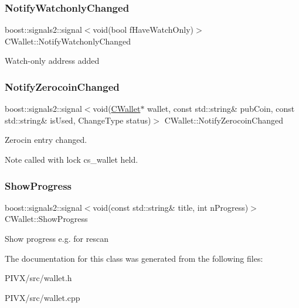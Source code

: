 \subsubsection{\texorpdfstring{Notify\+Watchonly\+Changed}{NotifyWatchonlyChanged}}
{\footnotesize\ttfamily boost\+::signals2\+::signal$<$void(bool f\+Have\+Watch\+Only)$>$ C\+Wallet\+::\+Notify\+Watchonly\+Changed}

Watch-\/only address added \mbox{\label{class_c_wallet_a30f82cd0f9feac86cd2b64999be7f9d7}} 
\subsubsection{\texorpdfstring{Notify\+Zerocoin\+Changed}{NotifyZerocoinChanged}}
{\footnotesize\ttfamily boost\+::signals2\+::signal$<$void(\mbox{\hyperlink{class_c_wallet}{C\+Wallet}}$\ast$ wallet, const std\+::string\& pub\+Coin, const std\+::string\& is\+Used, Change\+Type status)$>$ C\+Wallet\+::\+Notify\+Zerocoin\+Changed}

Zerocin entry changed. \begin{DoxyNote}{Note}
called with lock cs\+\_\+wallet held. 
\end{DoxyNote}
\mbox{\label{class_c_wallet_afa895ec96ad91fff551b4b9daf6ad4a6}} 
\subsubsection{\texorpdfstring{Show\+Progress}{ShowProgress}}
{\footnotesize\ttfamily boost\+::signals2\+::signal$<$void(const std\+::string\& title, int n\+Progress)$>$ C\+Wallet\+::\+Show\+Progress}

Show progress e.\+g. for rescan 

The documentation for this class was generated from the following files\+:\begin{DoxyCompactItemize}
\item 
P\+I\+V\+X/src/wallet.\+h\item 
P\+I\+V\+X/src/wallet.\+cpp\end{DoxyCompactItemize}
